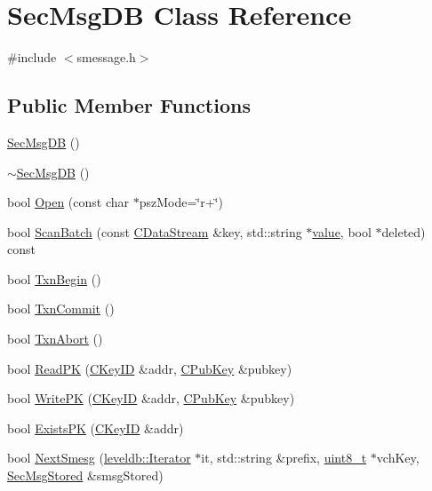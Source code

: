 \hypertarget{class_sec_msg_d_b}{}\section{Sec\+Msg\+D\+B Class Reference}
\label{class_sec_msg_d_b}


{\ttfamily \#include $<$smessage.\+h$>$}

\subsection*{Public Member Functions}
\begin{DoxyCompactItemize}
\item 
\hyperlink{class_sec_msg_d_b_a903159afeb64ca142f9f2634929e57fd}{Sec\+Msg\+D\+B} ()
\item 
\hyperlink{class_sec_msg_d_b_ac73f225e8632a99aeb3fb618935b0599}{$\sim$\+Sec\+Msg\+D\+B} ()
\item 
bool \hyperlink{class_sec_msg_d_b_a1fc6ac45b72e4df75be07fdadfc356ce}{Open} (const char $\ast$psz\+Mode=\char`\"{}r+\char`\"{})
\item 
bool \hyperlink{class_sec_msg_d_b_af26665a96e391711f4df702861d1557a}{Scan\+Batch} (const \hyperlink{class_c_data_stream}{C\+Data\+Stream} \&key, std\+::string $\ast$\hyperlink{cache_8cc_a0f61d63b009d0880a89c843bd50d8d76}{value}, bool $\ast$deleted) const 
\item 
bool \hyperlink{class_sec_msg_d_b_a0bbc537adf50f87a8bfaa68664e41c41}{Txn\+Begin} ()
\item 
bool \hyperlink{class_sec_msg_d_b_accabf13445ca07b9d37f456a3db6fe2f}{Txn\+Commit} ()
\item 
bool \hyperlink{class_sec_msg_d_b_a49e50670db162f8c9e192b7b00f0a813}{Txn\+Abort} ()
\item 
bool \hyperlink{class_sec_msg_d_b_aabce57e714b562302cee71bcea5e340f}{Read\+P\+K} (\hyperlink{class_c_key_i_d}{C\+Key\+I\+D} \&addr, \hyperlink{class_c_pub_key}{C\+Pub\+Key} \&pubkey)
\item 
bool \hyperlink{class_sec_msg_d_b_a77131fcd232e503a57ab8569d3ab9fd8}{Write\+P\+K} (\hyperlink{class_c_key_i_d}{C\+Key\+I\+D} \&addr, \hyperlink{class_c_pub_key}{C\+Pub\+Key} \&pubkey)
\item 
bool \hyperlink{class_sec_msg_d_b_ad039b1d29fc0e82695d3bd30087765b9}{Exists\+P\+K} (\hyperlink{class_c_key_i_d}{C\+Key\+I\+D} \&addr)
\item 
bool \hyperlink{class_sec_msg_d_b_ac16426690cd634af83b90aa39a7a5d51}{Next\+Smesg} (\hyperlink{classleveldb_1_1_iterator}{leveldb\+::\+Iterator} $\ast$it, std\+::string \&prefix, \hyperlink{stdint_8h_aba7bc1797add20fe3efdf37ced1182c5}{uint8\+\_\+t} $\ast$vch\+Key, \hyperlink{class_sec_msg_stored}{Sec\+Msg\+Stored} \&smsg\+Stored)

\end{DoxyCompactItemize}
